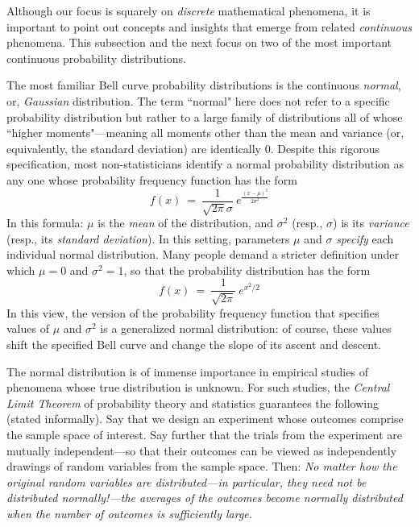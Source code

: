Although our focus is squarely on {\em discrete} mathematical phenomena, it is important to point out concepts and insights that emerge from related {\em continuous} phenomena.  This subsection and the next focus on two of the most important continuous probability distributions.

\medskip

The most familiar Bell curve probability distributions is the continuous {\em normal}, or, {\it Gaussian} distribution.  The term ``normal" here does not refer to a specific probability distribution but rather to a large family of distributions all of whose ``higher moments"---meaning all moments other than the mean and variance (or, equivalently, the standard deviation) are identically $0$.  Despite this rigorous specification, most non-statisticians identify a normal probability distribution as any one whose probability frequency function has the form
\[ f(x) \ = \ \frac{1}{\sqrt{2 \pi} \sigma} \ e^{\frac{(x - \mu)^2}{2 \sigma^2} } \]
In this formula: $\mu$ is the {\it mean} of the distribution, and $\sigma^2$ (resp., $\sigma$) is its {\it variance} (resp., its {\it standard deviation}).  In this setting, parameters $\mu$ and $\sigma$ {\em specify} each individual normal distribution.  Many people demand a stricter definition under which $\mu = 0$ and $\sigma^2 = 1$, so that the probability distribution has the form
\[ f(x) \ = \ \frac{1}{\sqrt{2 \pi}} \ e^{x^2/2} \]
In this view, the version of the probability frequency function that specifies values of $\mu$ and $\sigma^2$ is a generalized normal distribution: of course, these values shift the specified Bell curve and change the slope of its ascent and descent.

\bigskip

\noindent {}

\bigskip

 

The normal distribution is of immense importance in empirical studies of phenomena whose true distribution is unknown.  For such studies, the {\em Central Limit Theorem} of probability theory and statistics guarantees the following (stated informally).  Say that we design an experiment whose outcomes comprise the sample space of interest.  Say further that the trials from the experiment are mutually independent---so that their outcomes can be viewed as independently drawings of random variables from the sample space.  Then: {\em No matter how the original random variables are distributed---in particular, {\em they need not be distributed normally!}---the averages of the outcomes become normally distributed when the number of outcomes is sufficiently large. }

